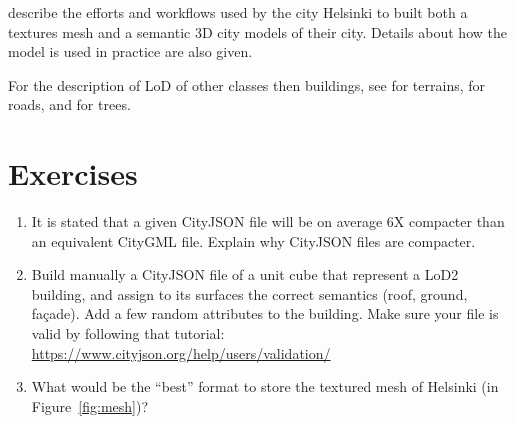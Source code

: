 \citet{Helsinki19} describe the efforts and workflows used by the city Helsinki to built both a textures mesh and a semantic 3D city models of their city. 
Details about how the model is used in practice are also given.

For the description of LoD of other classes then buildings, see \citet{Kumar19} for terrains, \citet{Labetski18} for roads, and \citet{Ortega18} for trees.

%
\section{Exercises}

\begin{enumerate}
  \item It is stated that a given CityJSON file will be on average 6X compacter than an equivalent CityGML file. Explain why CityJSON files are compacter.
  \item Build manually a CityJSON file of a unit cube that represent a LoD2 building, and assign to its surfaces the correct semantics (roof, ground, façade). Add a few random attributes to the building. Make sure your file is valid by following that tutorial: \url{https://www.cityjson.org/help/users/validation/}
  \item What would be the ``best'' format to store the textured mesh of Helsinki (in Figure~\ref{fig:mesh})?
\end{enumerate}
